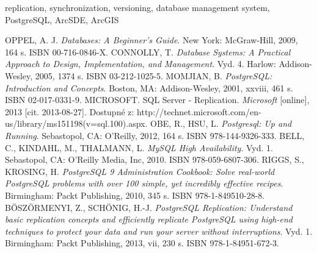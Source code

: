 \documentclass{llncs}
\begin{document}
\begin{keywordsEnglish}
  replication, synchronization, versioning, database management system, PostgreSQL, ArcSDE, ArcGIS
\end{keywordsEnglish}








\begin{thebibliography}{99}
     OPPEL, A. J. \emph{Databases: A Beginner’s Guide}. New York: McGraw-Hill, 2009, 164 s. ISBN 00-716-0846-X.
 CONNOLLY, T. \emph{Database Systems: A Practical Approach to Design, Implementation, and Management}. Vyd. 4. Harlow: Addison-Wesley, 2005, 1374 s. ISBN 03-212-1025-5.
 MOMJIAN, B. \emph{PostgreSQL: Introduction and Concepts}. Boston, MA: Addison-Wesley, 2001, xxviii, 461 s. ISBN 02-017-0331-9.
     MICROSOFT. SQL Server - Replication. \emph{Microsoft} [online], 2013 [cit. 2013-08-27]. Dostupné z: http://technet.microsoft.com/en-us/library/ms151198(v=sql.100).aspx.
     OBE, R., HSU, L. \emph{Postgresql: Up and Running}. Sebastopol, CA: O’Reilly, 2012, 164 s. ISBN 978-144-9326-333.
     BELL, C., KINDAHL, M., THALMANN, L. \emph{MySQL High Availability}. Vyd. 1. Sebastopol, CA: O’Reilly Media, Inc, 2010. ISBN 978-059-6807-306.
     RIGGS, S., KROSING, H. \emph{PostgreSQL 9 Administration Cookbook: Solve real-world     PostgreSQL problems with over 100 simple, yet incredibly effective recipes}. Birmingham: Packt Publishing, 2010, 345 s. ISBN 978-1-849510-28-8.
     BÖSZÖRMENYI, Z., SCHÖNIG, H.-J. \emph{PostgreSQL Replication: Understand basic replication concepts and efficiently replicate PostgreSQL using high-end techniques to protect your data and run your server without interruptions}. Vyd. 1. Birmingham: Packt Publishing, 2013, vii, 230 s. ISBN 978-1-84951-672-3.

\end{thebibliography}
\end{document}
